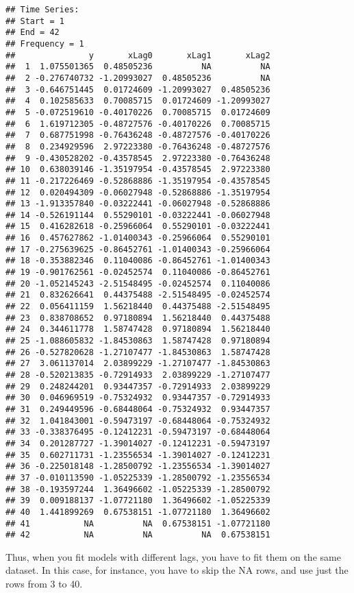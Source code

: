 \documentclass[
]{article}
\begin{document}
\begin{verbatim}
## Time Series:
## Start = 1 
## End = 42 
## Frequency = 1 
##               y       xLag0       xLag1       xLag2
##  1  1.075501365  0.48505236          NA          NA
##  2 -0.276740732 -1.20993027  0.48505236          NA
##  3 -0.646751445  0.01724609 -1.20993027  0.48505236
##  4  0.102585633  0.70085715  0.01724609 -1.20993027
##  5 -0.072519610 -0.40170226  0.70085715  0.01724609
##  6  1.619712305 -0.48727576 -0.40170226  0.70085715
##  7  0.687751998 -0.76436248 -0.48727576 -0.40170226
##  8  0.234929596  2.97223380 -0.76436248 -0.48727576
##  9 -0.430528202 -0.43578545  2.97223380 -0.76436248
## 10  0.638039146 -1.35197954 -0.43578545  2.97223380
## 11 -0.217226469 -0.52868886 -1.35197954 -0.43578545
## 12  0.020494309 -0.06027948 -0.52868886 -1.35197954
## 13 -1.913357840 -0.03222441 -0.06027948 -0.52868886
## 14 -0.526191144  0.55290101 -0.03222441 -0.06027948
## 15  0.416282618 -0.25966064  0.55290101 -0.03222441
## 16  0.457627862 -1.01400343 -0.25966064  0.55290101
## 17 -0.275639625 -0.86452761 -1.01400343 -0.25966064
## 18 -0.353882346  0.11040086 -0.86452761 -1.01400343
## 19 -0.901762561 -0.02452574  0.11040086 -0.86452761
## 20 -1.052145243 -2.51548495 -0.02452574  0.11040086
## 21  0.832626641  0.44375488 -2.51548495 -0.02452574
## 22  0.056411159  1.56218440  0.44375488 -2.51548495
## 23  0.838708652  0.97180894  1.56218440  0.44375488
## 24  0.344611778  1.58747428  0.97180894  1.56218440
## 25 -1.088605832 -1.84530863  1.58747428  0.97180894
## 26 -0.527820628 -1.27107477 -1.84530863  1.58747428
## 27  3.061137014  2.03899229 -1.27107477 -1.84530863
## 28 -0.520213835 -0.72914933  2.03899229 -1.27107477
## 29  0.248244201  0.93447357 -0.72914933  2.03899229
## 30  0.046969519 -0.75324932  0.93447357 -0.72914933
## 31  0.249449596 -0.68448064 -0.75324932  0.93447357
## 32  1.041843001 -0.59473197 -0.68448064 -0.75324932
## 33 -0.338376495 -0.12412231 -0.59473197 -0.68448064
## 34  0.201287727 -1.39014027 -0.12412231 -0.59473197
## 35  0.602711731 -1.23556534 -1.39014027 -0.12412231
## 36 -0.225018148 -1.28500792 -1.23556534 -1.39014027
## 37 -0.010113590 -1.05225339 -1.28500792 -1.23556534
## 38 -0.193597244  1.36496602 -1.05225339 -1.28500792
## 39  0.009188137 -1.07721180  1.36496602 -1.05225339
## 40  1.441899269  0.67538151 -1.07721180  1.36496602
## 41           NA          NA  0.67538151 -1.07721180
## 42           NA          NA          NA  0.67538151
\end{verbatim}

Thus, when you fit models with different lags, you have to fit them on the same dataset. In this case, for instance, you have to skip the NA rows, and use just the rows from 3 to 40.
\end{document}
